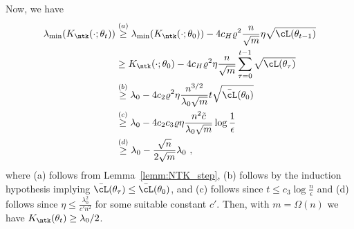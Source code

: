 Now, we have
\begin{align*}
\lambda_{\min}(K_{\ntk}(\cdot;\theta_t)) 
& \overset{(a)}{\geq} \lambda_{\min}(K_{\ntk}(\cdot;\theta_{0})) - 4 c_H \varrho^2 \frac{n}{\sqrt{m}} \eta \sqrt{\cL(\theta_{t-1})} \\
& \geq K_{\ntk}(\cdot;\theta_0) - 4 c_H \varrho^2 \eta   \frac{n}{\sqrt{m}} \sum_{\tau=0}^{t-1}  \sqrt{\cL(\theta_{\tau})}\\
& \overset{(b)}{\geq} \lambda_0 - 4 c_2  \varrho^2 \eta \frac{n^{3/2}}{\lambda_0\sqrt{m}} t \sqrt{\bar{\cL}(\theta_0)}\\
& \overset{(c)}{\geq} \lambda_0 - 4 c_2 c_3 \varrho \eta \frac{n^2 \tilde{c}}{\lambda_0 \sqrt{m}} \log \frac{1}{\epsilon} \\
& \overset{(d)}{\geq} \lambda_0 -  \frac{\sqrt{n}}{2 \sqrt{m}} \lambda_0  ~,
\end{align*}
%
where (a) follows from Lemma~\ref{lemm:NTK_step}, (b) follows by the induction hypothesis implying $\bar{\cL}(\theta_{\tau}) \leq \bar{\cL}(\theta_0)$, 
%
and (c) follows 
since $t \leq c_3 \log \frac{n}{\epsilon}$ and (d) follows since $\eta \leq \frac{\lambda_0^2}{c' n^2}$ for  some suitable constant $c'$.
Then, with $m = \Omega(n)$ we have $K_{\ntk}(\theta_t) \geq \lambda_0/2$.


